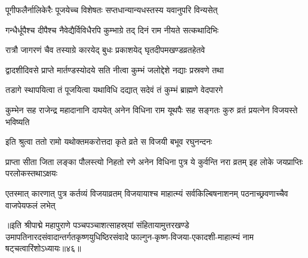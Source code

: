 \twolineshloka
{पूगीफलैर्नालिकेरैः पूजयेच्च विशेषतः}
{सप्तधान्यान्यधस्तस्य यवानुपरि विन्यसेत्}%

\twolineshloka
{गन्धैर्धूपैश्च दीपैश्च नैवेद्यैर्विविधैरपि}
{कुम्भाग्रे तद् दिनं राम नीयते सत्कथादिभिः}%

\twolineshloka
{रात्रौ जागरणं चैव तस्याग्रे कारयेद् बुधः}
{प्रकाशयेद् घृतदीपमखण्डव्रतहेतवे}%

\twolineshloka
{द्वादशीदिवसे प्राप्ते मार्तण्डस्योदये सति}
{नीत्वा कुम्भं जलोद्देशे नद्याः प्रस्रवणे तथा}%

\twolineshloka
{तडागे स्थापयित्वा तं पूजयित्वा यथाविधि}
{दद्यात् सदेवं तं कुम्भं ब्राह्मणे वेदपारगे}%

\threelineshloka
{कुम्भेन सह राजेन्द्र महादानानि दापयेत्}
{अनेन विधिना राम यूथपैः सह सङ्गतः}
{कुरु व्रतं प्रयत्नेन विजयस्ते भविष्यति}%


\twolineshloka
{इति श्रुत्वा ततो रामो यथोक्तमकरोत्तदा}
{कृते व्रते स विजयी बभूव रघुनन्दनः}%

\threelineshloka
{प्राप्ता सीता जिता लङ्का पौलस्त्यो निहतो रणे}
{अनेन विधिना पुत्र ये कुर्वन्ति नरा व्रतम्}
{इह लोके जयप्राप्तिः परलोकस्तथाऽक्षयः} %


\threelineshloka
{एतस्मात् कारणात् पुत्र कर्तव्यं विजयाव्रतम्}
{विजयायाश्च माहात्म्यं सर्वकिल्बिषनाशनम्}
{पठनाच्छ्रवणाच्चैव वाजपेयफलं लभेत्}%

॥इति श्रीपाद्मे महापुराणे पञ्चपञ्चाशत्साहस्र्यां संहितायामुत्तरखण्डे उमापतिनारदसंवादान्तर्गतकृष्णयुधिष्ठिरसंवादे फाल्गुन-कृष्ण-विजया-एकादशी-माहात्म्यं नाम षट्चत्वारिंशोऽध्यायः॥४६॥

